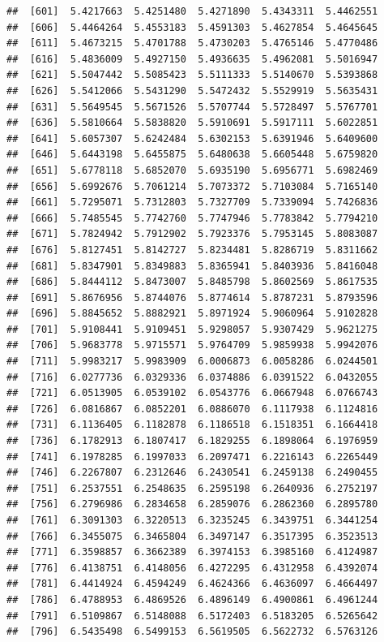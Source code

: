 \documentclass[
  11pt]{report}
\begin{document}
\begin{itemize}
\begin{verbatim}
##  [601]  5.4217663  5.4251480  5.4271890  5.4343311  5.4462551
##  [606]  5.4464264  5.4553183  5.4591303  5.4627854  5.4645645
##  [611]  5.4673215  5.4701788  5.4730203  5.4765146  5.4770486
##  [616]  5.4836009  5.4927150  5.4936635  5.4962081  5.5016947
##  [621]  5.5047442  5.5085423  5.5111333  5.5140670  5.5393868
##  [626]  5.5412066  5.5431290  5.5472432  5.5529919  5.5635431
##  [631]  5.5649545  5.5671526  5.5707744  5.5728497  5.5767701
##  [636]  5.5810664  5.5838820  5.5910691  5.5917111  5.6022851
##  [641]  5.6057307  5.6242484  5.6302153  5.6391946  5.6409600
##  [646]  5.6443198  5.6455875  5.6480638  5.6605448  5.6759820
##  [651]  5.6778118  5.6852070  5.6935190  5.6956771  5.6982469
##  [656]  5.6992676  5.7061214  5.7073372  5.7103084  5.7165140
##  [661]  5.7295071  5.7312803  5.7327709  5.7339094  5.7426836
##  [666]  5.7485545  5.7742760  5.7747946  5.7783842  5.7794210
##  [671]  5.7824942  5.7912902  5.7923376  5.7953145  5.8083087
##  [676]  5.8127451  5.8142727  5.8234481  5.8286719  5.8311662
##  [681]  5.8347901  5.8349883  5.8365941  5.8403936  5.8416048
##  [686]  5.8444112  5.8473007  5.8485798  5.8602569  5.8617535
##  [691]  5.8676956  5.8744076  5.8774614  5.8787231  5.8793596
##  [696]  5.8845652  5.8882921  5.8971924  5.9060964  5.9102828
##  [701]  5.9108441  5.9109451  5.9298057  5.9307429  5.9621275
##  [706]  5.9683778  5.9715571  5.9764709  5.9859938  5.9942076
##  [711]  5.9983217  5.9983909  6.0006873  6.0058286  6.0244501
##  [716]  6.0277736  6.0329336  6.0374886  6.0391522  6.0432055
##  [721]  6.0513905  6.0539102  6.0543776  6.0667948  6.0766743
##  [726]  6.0816867  6.0852201  6.0886070  6.1117938  6.1124816
##  [731]  6.1136405  6.1182878  6.1186518  6.1518351  6.1664418
##  [736]  6.1782913  6.1807417  6.1829255  6.1898064  6.1976959
##  [741]  6.1978285  6.1997033  6.2097471  6.2216143  6.2265449
##  [746]  6.2267807  6.2312646  6.2430541  6.2459138  6.2490455
##  [751]  6.2537551  6.2548635  6.2595198  6.2640936  6.2752197
##  [756]  6.2796986  6.2834658  6.2859076  6.2862360  6.2895780
##  [761]  6.3091303  6.3220513  6.3235245  6.3439751  6.3441254
##  [766]  6.3455075  6.3465804  6.3497147  6.3517395  6.3523513
##  [771]  6.3598857  6.3662389  6.3974153  6.3985160  6.4124987
##  [776]  6.4138751  6.4148056  6.4272295  6.4312958  6.4392074
##  [781]  6.4414924  6.4594249  6.4624366  6.4636097  6.4664497
##  [786]  6.4788953  6.4869526  6.4896149  6.4900861  6.4961244
##  [791]  6.5109867  6.5148088  6.5172403  6.5183205  6.5265642
##  [796]  6.5435498  6.5499153  6.5619505  6.5622732  6.5763126

\end{verbatim}
\end{itemize}
\end{document}
